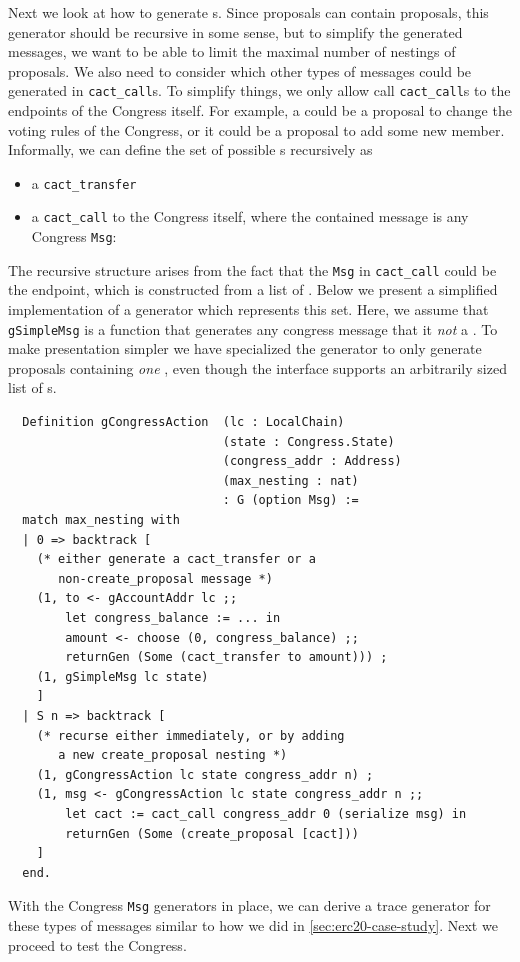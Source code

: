 \documentclass[twoside,11pt,openright]{report}
\newenvironment{code}{\captionsetup{type=figure, singlelinecheck=off, justification=raggedleft}}{}
\newcommand{\coq}[1]{\texttt{#1}}
\begin{document}
Next we look at how to generate \createproposal{}s. Since proposals can contain proposals, this generator should be recursive in some sense, but to simplify the generated messages, we want to be able to limit the maximal number of nestings of proposals. We also need to consider which other types of messages could be generated in \coq{cact\_call}s. 
To simplify things, we only allow call \coq{cact\_call}s to the endpoints of the Congress itself. For example, a \congressAction{} could be a proposal to change the voting rules of the Congress, or it could be a proposal to add some new member. Informally, we can define the set of possible \congressAction{}s recursively as
\begin{itemize}
    \item a \coq{cact\_transfer}
    \item a \coq{cact\_call} to the Congress itself, where the contained message is any Congress \coq{Msg}:
\end{itemize}
The recursive structure arises from the fact that the \coq{Msg} in \coq{cact\_call} could be the \createproposal{} endpoint, which is constructed from a list of \congressAction{}. Below we present a simplified implementation of a generator which represents this set. Here, we assume that \coq{gSimpleMsg} is a function that generates any congress message that it \textit{not} a \createproposal{}. To make presentation simpler we have specialized the generator to only generate proposals containing \textit{one} \congressAction{}, even though the interface supports an arbitrarily sized list of \congressAction{}s.
\begin{code}
\label{def:gCongressAction}
\begin{verbatim}
  Definition gCongressAction  (lc : LocalChain)
                              (state : Congress.State)
                              (congress_addr : Address)
                              (max_nesting : nat)
                              : G (option Msg) :=
  match max_nesting with
  | 0 => backtrack [
    (* either generate a cact_transfer or a 
       non-create_proposal message *)
    (1, to <- gAccountAddr lc ;;
        let congress_balance := ... in
        amount <- choose (0, congress_balance) ;;
        returnGen (Some (cact_transfer to amount))) ;
    (1, gSimpleMsg lc state)
    ]
  | S n => backtrack [
    (* recurse either immediately, or by adding
       a new create_proposal nesting *)
    (1, gCongressAction lc state congress_addr n) ;
    (1, msg <- gCongressAction lc state congress_addr n ;;
        let cact := cact_call congress_addr 0 (serialize msg) in
        returnGen (Some (create_proposal [cact]))
    ]
  end.
\end{verbatim}
\end{code}
With the Congress \coq{Msg} generators in place, we can derive a trace generator for these types of messages similar to how we did in \autoref{sec:erc20-case-study}. Next we proceed to test the Congress.
\end{document}
